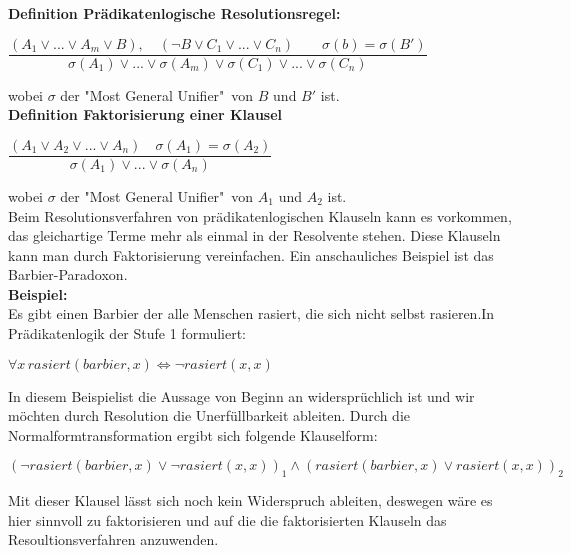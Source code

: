 \textbf{Definition Prädikatenlogische Resolutionsregel:}\\

\begin{center}
$\dfrac{( A_1 \vee ... \vee A_m \vee B ), \quad ( \neg B \vee C_1 \vee ... \vee C_n) \qquad \sigma(b) = \sigma(B')}{\sigma(A_1) \vee ... \vee \sigma(A_m)\vee \sigma(C_1) \vee ... \vee \sigma(C_n)}
$
\end{center}
wobei $\sigma$ der "Most General Unifier"\,  von $B$ und $B'$ ist.\cite[S.52]{GrundkursKI}\\

\textbf{Definition Faktorisierung einer Klausel}\\

\begin{center}
$\dfrac{( A_1 \vee A_2 \vee ... \vee A_n) \quad \sigma(A_1) = \sigma(A_2)}{\sigma(A_1) \vee ... \vee \sigma(A_n)}
$
\end{center}
wobei $\sigma$ der "Most General Unifier"\,  von $A_1$ und $A_2$ ist.\cite[vgl. S.52]{GrundkursKI}\\

Beim Resolutionsverfahren von prädikatenlogischen Klauseln kann es vorkommen, das gleichartige Terme mehr als einmal in der Resolvente stehen. Diese Klauseln kann man durch Faktorisierung vereinfachen. Ein anschauliches Beispiel ist das Barbier-Paradoxon.\\

\textbf{Beispiel:}\\
\glqq 
Es gibt einen Barbier der alle Menschen rasiert, die sich nicht selbst rasieren.\grqq In Prädikatenlogik der Stufe 1 formuliert:\\
\begin{center}
$\forall x \, rasiert(barbier, x) \Leftrightarrow \neg rasiert(x, x)$
\end{center}
In diesem Beispielist die Aussage von Beginn an widersprüchlich ist und wir möchten durch Resolution die Unerfüllbarkeit ableiten. Durch die Normalformtransformation ergibt sich folgende Klauselform:\\
\begin{center}
$
(\neg rasiert(barbier, x) \vee \neg rasiert(x, x))_1 \wedge (rasiert(barbier, x) \vee rasiert(x, x))_2
$
\end{center}
Mit dieser Klausel lässt sich noch kein Widerspruch ableiten, deswegen wäre es hier sinnvoll zu faktorisieren und auf die die faktorisierten Klauseln das Resoultionsverfahren anzuwenden.

